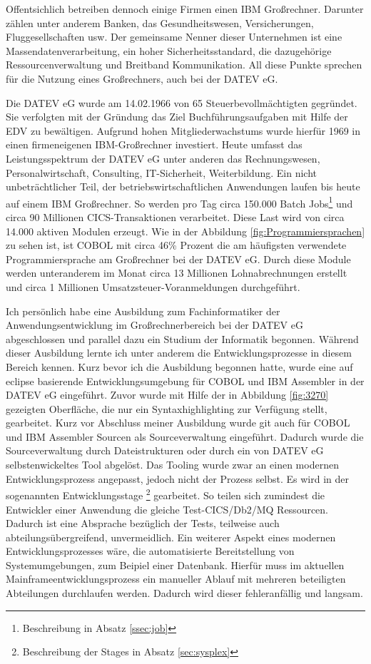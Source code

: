 Offentsichlich betreiben dennoch einige Firmen einen IBM Großrechner.
Darunter zählen unter anderem Banken, das Gesundheitswesen, Versicherungen, Fluggesellschaften usw.
Der gemeinsame Nenner dieser Unternehmen ist eine Massendatenverarbeitung, ein hoher Sicherheitsstandard, die dazugehörige Ressourcenverwaltung und Breitband Kommunikation.
All diese Punkte sprechen für die Nutzung eines Großrechners, auch bei der DATEV eG.
\cite{IBM.2014}

Die DATEV eG wurde am 14.02.1966 von 65 Steuerbevollmächtigten gegründet.
Sie verfolgten mit der Gründung das Ziel Buchführungsaufgaben mit Hilfe der EDV zu bewältigen.
Aufgrund hohen Mitgliederwachstums wurde hierfür 1969 in einen firmeneigenen IBM-Großrechner investiert.\cite{DATEVeG.2017}
Heute umfasst das Leistungsspektrum der DATEV eG unter anderen das Rechnungswesen, Personalwirtschaft, Consulting, IT-Sicherheit, Weiterbildung.
Ein nicht unbeträchtlicher Teil, der betriebswirtschaftlichen Anwendungen laufen bis heute auf einem IBM Großrechner.
So werden pro Tag circa 150.000 Batch Jobs\footnote{Beschreibung in Absatz \ref{ssec:job}} und circa 90 Millionen CICS-Transaktionen verarbeitet.
Diese Last wird von circa 14.000 aktiven Modulen erzeugt.
Wie in der Abbildung \ref{fig:Programmiersprachen} zu sehen ist, ist COBOL mit circa 46\% Prozent die am häufigsten verwendete Programmiersprache am Großrechner bei der DATEV eG.
Durch diese Module werden unteranderem im Monat circa 13 Millionen Lohnabrechnungen erstellt und circa 1 Millionen Umsatzsteuer-Voranmeldungen durchgeführt.

Ich persönlich habe eine Ausbildung zum Fachinformatiker der Anwendungsentwicklung im Großrechnerbereich bei der DATEV eG abgeschlossen und parallel dazu ein Studium der Informatik begonnen.
Während dieser Ausbildung lernte ich unter anderem die Entwicklungsprozesse in diesem Bereich kennen.
Kurz bevor ich die Ausbildung begonnen hatte, wurde eine auf eclipse basierende Entwicklungsumgebung für COBOL und IBM Assembler in der DATEV eG eingeführt.
Zuvor wurde mit Hilfe der in Abbildung \ref{fig:3270} gezeigten Oberfläche, die nur ein Syntaxhighlighting zur Verfügung stellt, gearbeitet.
Kurz vor Abschluss meiner Ausbildung wurde git auch für COBOL und IBM Assembler Sourcen als Sourceverwaltung eingeführt.
Dadurch wurde die Sourceverwaltung durch Dateistrukturen oder durch ein von DATEV eG selbstenwickeltes Tool abgelöst.
Das Tooling wurde zwar an einen modernen Entwicklungsprozess angepasst, jedoch nicht der Prozess selbst.
Es wird in der sogenannten \glqq Entwicklungsstage \grqq{} \footnote{Beschreibung der Stages in Absatz \ref{sec:sysplex}} gearbeitet.
So teilen sich zumindest die Entwickler einer Anwendung die gleiche Test-CICS/Db2/MQ Ressourcen.
Dadurch ist eine Absprache bezüglich der Tests, teilweise auch abteilungsübergreifend, unvermeidlich.
Ein weiterer Aspekt eines modernen Entwicklungsprozesses wäre, die automatisierte Bereitstellung von Systemumgebungen, zum Beipiel einer Datenbank.
Hierfür muss im aktuellen Mainframeentwicklungsprozess ein manueller Ablauf mit mehreren beteiligten Abteilungen durchlaufen werden.
Dadurch wird dieser fehleranfällig und langsam.

